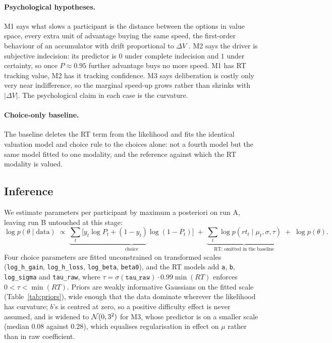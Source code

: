 \documentclass[11pt,a4paper]{article}
\begin{document}
\paragraph{Psychological hypotheses.}
M1 says what slows a participant is the distance between the options in value space, every
extra unit of advantage buying the same speed, the first-order behaviour of an accumulator with
drift proportional to $\Delta V$ \citep{ratcliff2008,krajbich2010}. M2 says the driver is
subjective indecision: its predictor is $0$ under complete indecision and $1$ under certainty,
so once $P\approx0.95$ further advantage buys no more speed. M1 has RT tracking value, M2 has
it tracking confidence. M3 says deliberation is costly only very near indifference, so the
marginal speed-up grows rather than shrinks with $|\Delta V|$. The psychological claim in each
case is the curvature.

\paragraph{Choice-only baseline.}
The baseline deletes the RT term from the likelihood and fits the identical valuation model and
choice rule to the choices alone: not a fourth model but the same model fitted to one modality,
and the reference against which the RT modality is valued.

\subsection{Inference}

We estimate parameters per participant by maximum a posteriori on run A, leaving run B
untouched at this stage:
\begin{equation}
\log p(\theta\mid\text{data})\;\propto\;
\underbrace{\textstyle\sum_t\big[y_t\log P_t+(1-y_t)\log(1-P_t)\big]}_{\text{choice}}
\;+\;\underbrace{\textstyle\sum_t\log p(rt_t\mid\mu_t,\sigma,\tau)}_{\text{RT; omitted in the baseline}}
\;+\;\log p(\theta).
\end{equation}
Four choice parameters are fitted unconstrained on transformed scales
(\texttt{log\_h\_gain}, \texttt{log\_h\_loss}, \texttt{log\_beta}, \texttt{beta0}), and the RT
models add \texttt{a}, \texttt{b}, \texttt{log\_sigma} and \texttt{tau\_raw}, where
$\tau=\sigma(\texttt{tau\_raw})\cdot0.99\min(RT)$ enforces $0<\tau<\min(RT)$. Priors are weakly
informative Gaussians on the fitted scale (Table~\ref{tab:priors}), wide enough that the data
dominate wherever the likelihood has curvature; $b$'s is centred at zero, so a positive
difficulty effect is never assumed, and is widened to $\mathcal{N}(0,3^2)$ for M3, whose predictor is on
a smaller scale (median $0.08$ against $0.28$), which equalises regularisation in effect on
$\mu$ rather than in raw coefficient.
\end{document}
